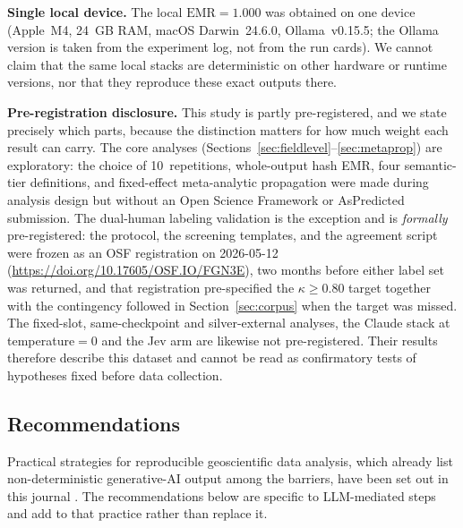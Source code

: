 \documentclass[preprint,review,12pt,authoryear]{elsarticle}
\newcommand{\emr}{\textrm{EMR}}
\begin{document}
\textbf{Single local device.}
The local $\emr{=}1.000$ was obtained on one device (Apple~M4, 24~GB RAM, macOS Darwin~24.6.0, Ollama~v0.15.5; the Ollama version is taken from the experiment log, not from the run cards). We cannot claim that the same local stacks are deterministic on other hardware or runtime versions, nor that they reproduce these exact outputs there.

\textbf{Pre-registration disclosure.}
This study is partly pre-registered, and we state precisely which parts, because the distinction matters for how much weight each result can carry.
The core analyses (Sections~\ref{sec:fieldlevel}--\ref{sec:metaprop}) are exploratory: the choice of 10~repetitions, whole-output hash EMR, four semantic-tier definitions, and fixed-effect meta-analytic propagation were made during analysis design but without an Open Science Framework or AsPredicted submission.
The dual-human labeling validation is the exception and is \emph{formally} pre-registered: the protocol, the screening templates, and the agreement script were frozen as an OSF registration on 2026-05-12 (\url{https://doi.org/10.17605/OSF.IO/FGN3E}), two months before either label set was returned, and that registration pre-specified the $\kappa{\geq}0.80$ target together with the contingency followed in Section~\ref{sec:corpus} when the target was missed.
The fixed-slot, same-checkpoint and silver-external analyses, the Claude stack at temperature${=}$0 and the Jev arm are likewise not pre-registered.
Their results therefore describe this dataset and cannot be read as confirmatory tests of hypotheses fixed before data collection.

\subsection{Recommendations}
\label{sec:recommendations}

Practical strategies for reproducible geoscientific data analysis, which already list non-deterministic generative-AI output among the barriers, have been set out in this journal \citep{schlogl2026reproducibility}. The recommendations below are specific to LLM-mediated steps and add to that practice rather than replace it.
\end{document}
